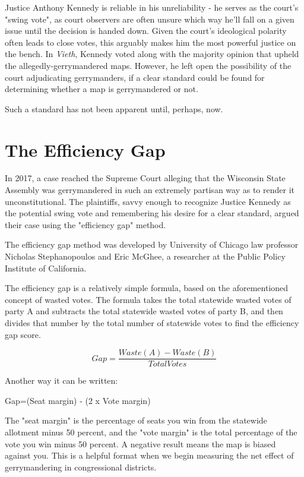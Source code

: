 \documentclass[sigconf]{acmart}
\begin{document}
Justice Anthony Kennedy is reliable in his unreliability - he serves as the court's "swing vote", as court observers are often unsure which way he'll fall on a given issue until the decision is handed down. Given the court's ideological polarity often leads to close votes, this arguably makes him the most powerful justice on the bench. In \textit{Vieth}, Kennedy voted along with the majority opinion that upheld the allegedly-gerrymandered maps. However, he left open the possibility of the court adjudicating gerrymanders, if a clear standard could be found for determining whether a map is gerrymandered or not.\cite{wapo}

Such a standard has not been apparent until, perhaps, now.

\section{The Efficiency Gap}
In 2017, a case reached the Supreme Court alleging that the Wisconsin State Assembly was gerrymandered in such an extremely partisan way as to render it unconstitutional. The plaintiffs, savvy enough to recognize Justice Kennedy as the potential swing vote and remembering his desire for a clear standard, argued their case using the "efficiency gap" method.\cite{wapo}

The efficiency gap method was developed by University of Chicago law professor Nicholas Stephanopoulos and Eric McGhee, a researcher at the Public Policy Institute of California.\cite{chicago}

The efficiency gap is a relatively simple formula, based on the aforementioned concept of wasted votes. The formula takes the total statewide wasted votes of party A and subtracts the total statewide wasted votes of party B, and then divides that number by the total number of statewide votes to find the efficiency gap score.\cite{chicagoformula}

\[Gap=\frac{Waste(A)-Waste(B)}{TotalVotes}\]

Another way it can be written:

\begin{center}
    Gap=(Seat margin) - (2 x Vote margin)
\end{center}

The "seat margin" is the percentage of seats you win from the statewide allotment minus 50 percent, and the "vote margin" is the total percentage of the vote you win minus 50 percent. A negative result means the map is biased against you.\cite{chicagoformula} This is a helpful format when we begin measuring the net effect of gerrymandering in congressional districts.
\end{document}
